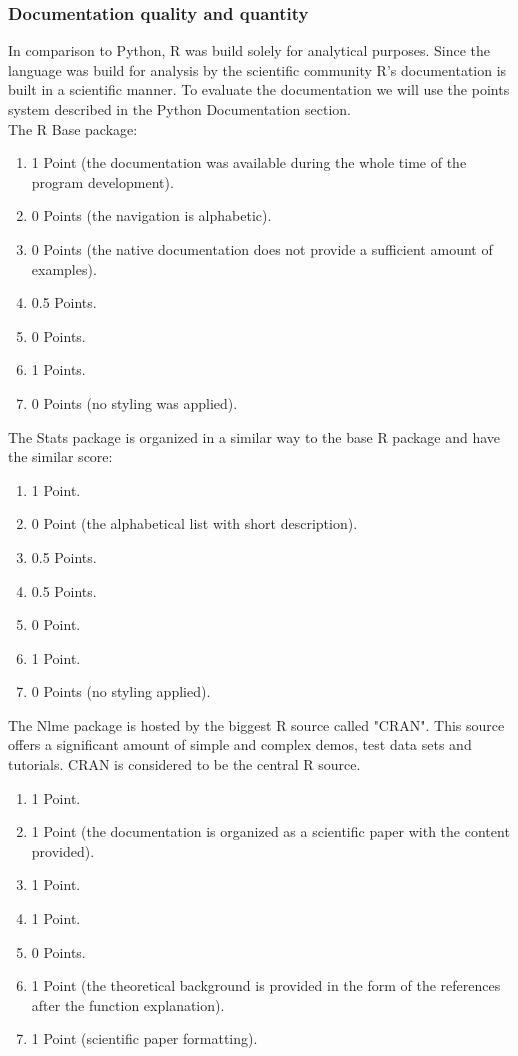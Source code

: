 \documentclass[
  twoside,
  12pt, a4paper,
  footinclude=true,
  headinclude=true,
  cleardoublepage=empty
]{article}
\begin{document}
\subsubsection{Documentation quality and quantity}
In comparison to Python, R was build solely for analytical purposes. Since the language was build for analysis by the scientific community R's documentation is built in a scientific manner. To evaluate the documentation we will use the points system described in the Python Documentation section.\\
The R Base package:
\begin{enumerate}
    \item 1 Point (the documentation was available during the whole time of the program development).
    \item 0 Points (the navigation is alphabetic).
    \item 0 Points (the native documentation does not provide a sufficient amount of examples).
    \item 0.5 Points.
    \item 0 Points.
    \item 1 Points.
    \item 0 Points (no styling was applied).
\end{enumerate}
The Stats package is organized in a similar way to the base R package and have the similar score:
\begin{enumerate}
    \item 1 Point.
    \item 0 Point (the alphabetical list with short description).
    \item 0.5 Points.
    \item 0.5 Points.
    \item 0 Point.
    \item 1 Point.
    \item 0 Points (no styling applied).
\end{enumerate} 
The Nlme package is hosted by the biggest R source called "CRAN". This source offers a significant amount of simple and complex demos, test data sets and tutorials. CRAN is considered to be the central R source.
\begin{enumerate}
    \item 1 Point.
    \item 1 Point (the documentation is organized as a scientific paper with the content provided).
    \item 1 Point.
    \item 1 Point.
    \item 0 Points.
    \item 1 Point (the theoretical background is provided in the form of the references after the function explanation).
    \item 1 Point (scientific paper formatting).
\end{enumerate}
\end{document}

